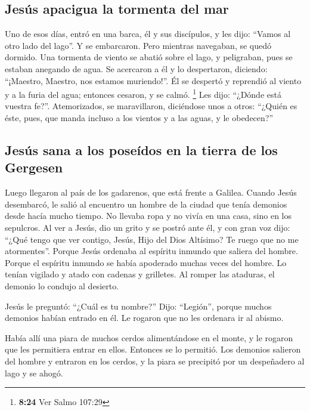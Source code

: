\begin{paracol}{2}
\hypertarget{jesuxfas-apacigua-la-tormenta-del-mar}{%
\subsection{Jesús apacigua la tormenta del
mar}\label{jesuxfas-apacigua-la-tormenta-del-mar}}

 Uno de esos días, entró en una barca, él y sus
discípulos, y les dijo: ``Vamos al otro lado del lago''. Y se
embarcaron.  Pero mientras navegaban, se quedó dormido.
Una tormenta de viento se abatió sobre el lago, y peligraban, pues se
estaban anegando de agua.  Se acercaron a él y lo
despertaron, diciendo: ``¡Maestro, Maestro, nos estamos muriendo!''. Él
se despertó y reprendió al viento y a la furia del agua; entonces
cesaron, y se calmó. \footnote{\textbf{8:24} Ver Salmo 107:29}
 Les dijo: ``¿Dónde está vuestra fe?''. Atemorizados, se
maravillaron, diciéndose unos a otros: ``¿Quién es éste, pues, que manda
incluso a los vientos y a las aguas, y le obedecen?''

\hypertarget{jesuxfas-sana-a-los-poseuxeddos-en-la-tierra-de-los-gergesen}{%
\subsection{Jesús sana a los poseídos en la tierra de los
Gergesen}\label{jesuxfas-sana-a-los-poseuxeddos-en-la-tierra-de-los-gergesen}}

 Luego llegaron al país de los gadarenos, que está frente
a Galilea.  Cuando Jesús desembarcó, le salió al
encuentro un hombre de la ciudad que tenía demonios desde hacía mucho
tiempo. No llevaba ropa y no vivía en una casa, sino en los sepulcros.
 Al ver a Jesús, dio un grito y se postró ante él, y con
gran voz dijo: ``¿Qué tengo que ver contigo, Jesús, Hijo del Dios
Altísimo? Te ruego que no me atormentes''.  Porque Jesús
ordenaba al espíritu inmundo que saliera del hombre. Porque el espíritu
inmundo se había apoderado muchas veces del hombre. Lo tenían vigilado y
atado con cadenas y grilletes. Al romper las ataduras, el demonio lo
condujo al desierto.

 Jesús le preguntó: ``¿Cuál es tu nombre?'' Dijo:
``Legión'', porque muchos demonios habían entrado en él. 
Le rogaron que no les ordenara ir al abismo.

 Había allí una piara de muchos cerdos alimentándose en
el monte, y le rogaron que les permitiera entrar en ellos. Entonces se
lo permitió.  Los demonios salieron del hombre y entraron
en los cerdos, y la piara se precipitó por un despeñadero al lago y se
ahogó.


\end{paracol}
